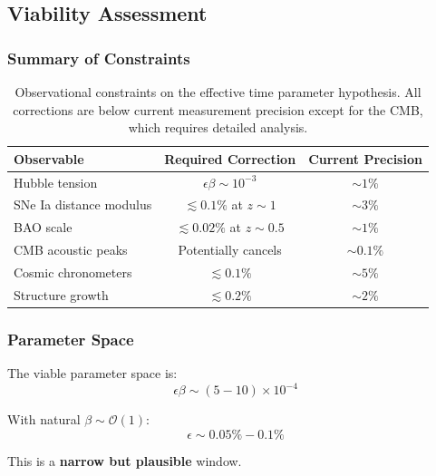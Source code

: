 \subsection{Viability Assessment}

\subsubsection{Summary of Constraints}

\begin{table}[h]
\centering
\begin{tabular}{lcc}
\hline
\textbf{Observable} & \textbf{Required Correction} & \textbf{Current Precision} \\
\hline
Hubble tension & $\epsilon \beta \sim 10^{-3}$ & $\sim 1\%$ \\
SNe Ia distance modulus & $\lesssim 0.1\%$ at $z \sim 1$ & $\sim 3\%$ \\
BAO scale & $\lesssim 0.02\%$ at $z \sim 0.5$ & $\sim 1\%$ \\
CMB acoustic peaks & Potentially cancels & $\sim 0.1\%$ \\
Cosmic chronometers & $\lesssim 0.1\%$ & $\sim 5\%$ \\
Structure growth & $\lesssim 0.2\%$ & $\sim 2\%$ \\
\hline
\end{tabular}
\caption{Observational constraints on the effective time parameter hypothesis. All corrections are below current measurement precision except for the CMB, which requires detailed analysis.}
\label{tab:constraints}
\end{table}

\subsubsection{Parameter Space}

The viable parameter space is:
\begin{equation}
\epsilon \beta \sim (5-10) \times 10^{-4}
\label{eq:viable_param_space}
\end{equation}

With natural $\beta \sim \mathcal{O}(1)$:
\begin{equation}
\epsilon \sim 0.05\% - 0.1\%
\label{eq:viable_epsilon}
\end{equation}

This is a \textbf{narrow but plausible} window.

